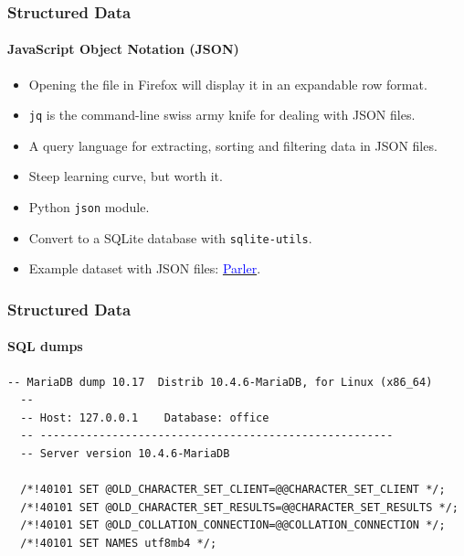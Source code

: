 \documentclass[aspectratio=169,usenames,dvipsnames]{beamer}
\begin{document}
\begin{frame}
  \frametitle{Structured Data}
  \framesubtitle{JavaScript Object Notation (JSON)}

  \begin{itemize}[<+->]
    \item Opening the file in Firefox will display it in an expandable row
      format.
    \item \texttt{jq} is the command-line swiss army knife for dealing
      with JSON files.
    \item A query language for extracting, sorting and filtering data in JSON
      files.
    \item Steep learning curve, but worth it.
    \item Python \texttt{json} module.
    \item Convert to a SQLite database with \texttt{sqlite-utils}.
    \item Example dataset with JSON files:
      \href{https://ddosecrets.com/wiki/Parler}{\textcolor{blue}{Parler}}.
  \end{itemize}

\end{frame}

\begin{frame}[fragile]
  \frametitle{Structured Data}
  \framesubtitle{SQL dumps}

  \begin{lstlisting}[basicstyle=\scriptsize]
  -- MariaDB dump 10.17  Distrib 10.4.6-MariaDB, for Linux (x86_64)
  --
  -- Host: 127.0.0.1    Database: office
  -- ------------------------------------------------------
  -- Server version	10.4.6-MariaDB

  /*!40101 SET @OLD_CHARACTER_SET_CLIENT=@@CHARACTER_SET_CLIENT */;
  /*!40101 SET @OLD_CHARACTER_SET_RESULTS=@@CHARACTER_SET_RESULTS */;
  /*!40101 SET @OLD_COLLATION_CONNECTION=@@COLLATION_CONNECTION */;
  /*!40101 SET NAMES utf8mb4 */;
  \end{lstlisting}
\end{frame}
\end{document}

